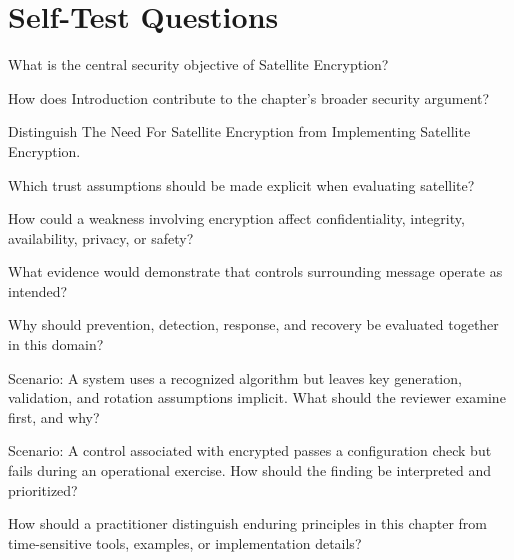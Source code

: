 \documentclass[11pt,letterpaper]{article}
\begin{document}
\section*{Self-Test Questions}
\begin{CornellRecallList}
\item What is the central security objective of Satellite Encryption?
\item How does Introduction contribute to the chapter's broader security argument?
\item Distinguish The Need For Satellite Encryption from Implementing Satellite Encryption.
\item Which trust assumptions should be made explicit when evaluating satellite?
\item How could a weakness involving encryption affect confidentiality, integrity, availability, privacy, or safety?
\item What evidence would demonstrate that controls surrounding message operate as intended?
\item Why should prevention, detection, response, and recovery be evaluated together in this domain?
\item Scenario: A system uses a recognized algorithm but leaves key generation, validation, and rotation assumptions implicit. What should the reviewer examine first, and why?
\item Scenario: A control associated with encrypted passes a configuration check but fails during an operational exercise. How should the finding be interpreted and prioritized?
\item How should a practitioner distinguish enduring principles in this chapter from time-sensitive tools, examples, or implementation details?
\end{CornellRecallList}
\end{document}
